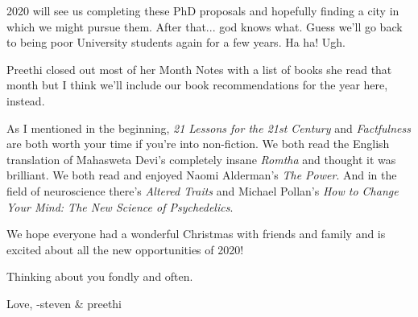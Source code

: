 \documentclass{article}
\begin{document}
2020 will see us completing these PhD proposals and hopefully finding a city in which
we might pursue them. After that... god knows what. Guess we'll go back to being poor
University students again for a few years. Ha ha! Ugh.

Preethi closed out most of her Month Notes with a list of books she read that month
but I think we'll include our book recommendations for the year here, instead.

As I mentioned in the beginning, \textit{21 Lessons for the 21st Century} and
\textit{Factfulness} are both worth your time if you're into non-fiction. We both
read the English translation of Mahasweta Devi's completely insane \textit{Romtha}
and thought it was brilliant. We both read and enjoyed Naomi Alderman's \textit{The
  Power}. And in the field of neuroscience there's \textit{Altered Traits} and
Michael Pollan's \textit{How to Change Your Mind: The New Science of Psychedelics}.

We hope everyone had a wonderful Christmas with friends and family and is excited
about all the new opportunities of 2020!

Thinking about you fondly and often.

Love,
-steven \& preethi
\end{document}
